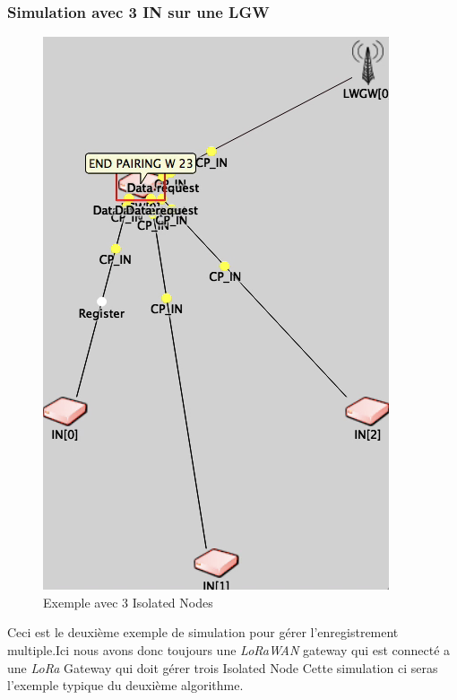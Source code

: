 \documentclass[11pt]{article}
\begin{document}
\subsubsection{Simulation avec 3 IN sur une LGW}
\begin{figure}[!ht]
\centering
\includegraphics[scale=0.6]{3IN.png} 
\caption{Exemple avec 3 Isolated Nodes}
\end{figure}
Ceci est le deuxième exemple de simulation pour gérer l'enregistrement multiple.Ici nous avons donc toujours une  \textit{LoRaWAN} gateway qui est connecté a une \textit{LoRa} Gateway qui doit gérer trois Isolated Node Cette simulation ci seras l'exemple typique du deuxième algorithme.
\newpage
\end{document}
